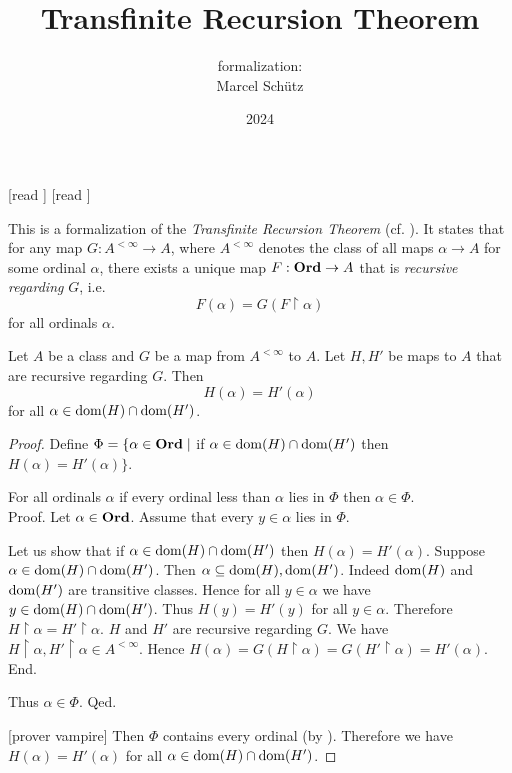 \documentclass{article}
\title{Transfinite Recursion Theorem}
\author{\Naproche formalization:\\[0.5em]Marcel Schütz}
\date{2024}
\begin{document}
  \maketitle

  \begin{imports}
    \begin{forthel}
      [read ]
      [read ]
    \end{forthel}
  \end{imports}
  
  \noindent This is a formalization of the \emph{Transfinite Recursion Theorem}
  (cf. \cite{Koepke2018}).
  It states that for any map $G : A^{< \infty} \to A$, where $A^{< \infty}$
  denotes the class of all maps $\alpha \to A$ for some ordinal $\alpha$, there
  exists a unique map $F: \textbf{Ord} \to A$ that is \emph{recursive regarding} $G$,
  i.e. \[F(\alpha) = G(F \restriction \alpha)\] for all ordinals $\alpha$.

  \begin{forthel}
    \begin{lemma*}[title=Coincidence Lemma,id=coincidence]
      Let $A$ be a class and $G$ be a map from $A^{< \infty}$ to $A$.
      Let $H, H'$ be maps to $A$ that are recursive regarding $G$.
      Then \[ H(\alpha) = H'(\alpha) \] for all $\alpha \in \operatorname{dom}(H) \cap \operatorname{dom}(H')$.
    \end{lemma*}
    \begin{proof}
      Define $\Phi = \{ \alpha \in \textbf{Ord} \mid$ if
      $\alpha \in \operatorname{dom}(H) \cap \operatorname{dom}(H')$ then $H(\alpha) = H'(\alpha) \}$.

      For all ordinals $\alpha$ if every ordinal less than $\alpha$ lies in $\Phi$ then $\alpha \in \Phi$. \\
      Proof.
        Let $\alpha \in \textbf{Ord}$.
        Assume that every $y \in \alpha$ lies in $\Phi$.

        Let us show that if $\alpha \in \operatorname{dom}(H) \cap \operatorname{dom}(H')$ then
        $H(\alpha) = H'(\alpha)$.
          Suppose $\alpha \in \operatorname{dom}(H) \cap \operatorname{dom}(H')$.
          Then $\alpha \subseteq \operatorname{dom}(H), \operatorname{dom}(H')$.
          Indeed $\operatorname{dom}(H)$ and $\operatorname{dom}(H')$ are transitive classes.
          Hence for all $y \in \alpha$ we have $y \in \operatorname{dom}(H) \cap \operatorname{dom}(H')$.
          Thus $H(y) = H'(y)$ for all $y \in \alpha$.
          Therefore $H \restriction \alpha = H' \restriction \alpha$.
          $H$ and $H'$ are recursive regarding $G$.
          We have $H \restriction \alpha, H' \restriction \alpha \in A^{< \infty}$.
          Hence $H(\alpha)
            = G(H \restriction \alpha)
            = G(H' \restriction \alpha)
            = H'(\alpha)$.
        End.

        Thus $\alpha \in \Phi$.
      Qed.

      [prover vampire]
      Then $\Phi$ contains every ordinal (by ).
      Therefore we have $H(\alpha) = H'(\alpha)$ for all $\alpha \in \operatorname{dom}(H) \cap \operatorname{dom}(H')$.
    \end{proof}
  \end{forthel}
\end{document}
